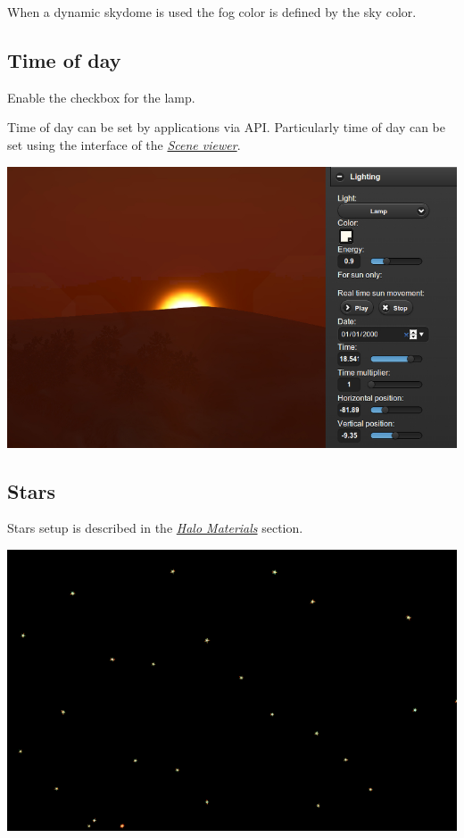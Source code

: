 \documentclass[a4paper,12pt,oneside]{sphinxmanual}
\begin{document}
When a dynamic skydome is used the fog color is defined by the sky color.


\subsection{Time of day}
\label{outdoor_rendering:id28}
Enable the  checkbox for the lamp.

Time of day can be set by applications via API. Particularly time of day can be set using the  interface of the {\hyperref[viewer:viewer]{\emph{Scene viewer}}}.

{\hfill\includegraphics[width=1.000\linewidth]{sunset.jpg}\hfill}


\subsection{Stars}
\label{outdoor_rendering:id29}
Stars setup is described in the {\hyperref[materials:material-halo]{\emph{Halo Materials}}} section.

{\hfill\includegraphics[width=1.000\linewidth]{stars.jpg}\hfill}
\end{document}
